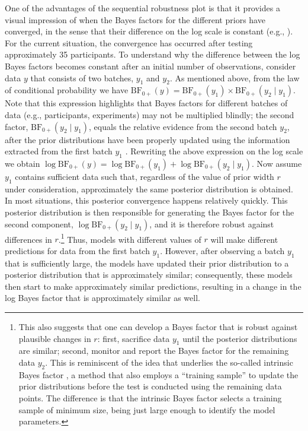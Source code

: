One of the advantages of the sequential robustness plot is that it provides a visual impression of when the Bayes factors for the different priors have converged, in the sense that their difference on the log scale is constant (e.g., ). For the current situation, the convergence has occurred after testing approximately 35 participants. To understand why the difference between the log Bayes factors becomes constant after an initial number of observations, consider data $y$ that consists of two batches, $y_1$ and $y_2$. As mentioned above, from the law of conditional probability we have $\text{BF}_{0+}(y) = \text{BF}_{0+}(y_1) \times \text{BF}_{0+}(y_2 \mid y_1)$. Note that this expression highlights that Bayes factors for different batches of data (e.g., participants, experiments) may not be multiplied blindly; the second factor, $\text{BF}_{0+}(y_2 \mid y_1)$, equals the relative evidence from the second batch $y_2$, after the prior distributions have been properly updated using the information extracted from the first batch $y_1$ \cite[p. 333]{Jeffreys1961}. Rewriting the above expression on the log scale we obtain $\log{\text{BF}_{0+}(y)} = \log{\text{BF}_{0+}(y_1)} + \log{\text{BF}_{0+}(y_2 \mid y_1)}$. Now assume $y_1$ contains sufficient data such that, regardless of the value of prior width $r$ under consideration, approximately the same posterior distribution is obtained. In most situations, this posterior convergence happens relatively quickly. This posterior distribution is then responsible for generating the Bayes factor for the second component, $\log{\text{BF}_{0+}(y_2 \mid y_1)}$, and it is therefore robust against differences in $r$.\footnote{This also suggests that one can develop a Bayes factor that is robust against plausible changes in $r$: first, sacrifice data $y_1$ until the posterior distributions are similar; second, monitor and report the Bayes factor for the remaining data $y_2$. This is reminiscent of the idea that underlies the so-called intrinsic Bayes factor \cite{BergerPericchi1996}, a method that also employs a ``training sample'' to update the prior distributions before the test is conducted using the remaining data points. The difference is that the intrinsic Bayes factor selects a training sample of minimum size, being just large enough to identify the model parameters.} Thus, models with different values of $r$ will make different predictions for data from the first batch $y_1$. However, after observing a batch $y_1$ that is sufficiently large, the models have updated their prior distribution to a posterior distribution that is approximately similar; consequently, these models then start to make approximately similar predictions, resulting in a change in the log Bayes factor that is approximately similar as well.

